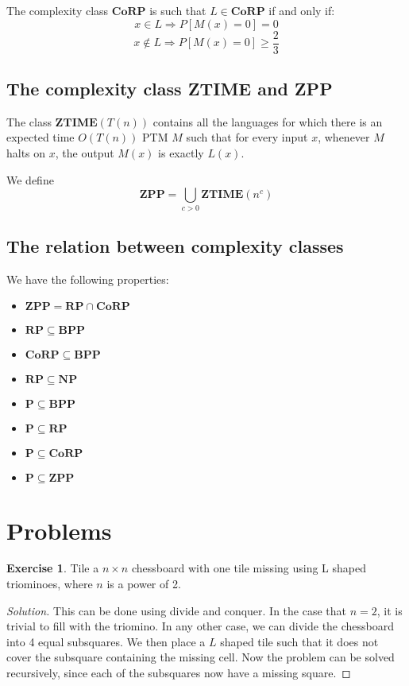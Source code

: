 \documentclass[12pt,letterpaper]{article}
\theoremstyle{definition}
\newtheorem*{exercise}{Exercise}
\newenvironment{solution}
  {\renewcommand\qedsymbol{$\blacksquare$}\begin{proof}[Solution]}
  {\end{proof}}
\begin{document}
The complexity class $\mathbf{CoRP}$ is such that $L \in \mathbf{CoRP}$ if and only if:
\[x \in L \Rightarrow P[M(x) = 0] = 0\]
\[x \notin L \Rightarrow P[M(x) = 0] \geq \frac{2}{3}\]

\subsection{The complexity class ZTIME and ZPP}

The class $\mathbf{ZTIME}(T(n))$ contains all the languages for which there is an expected time $O(T(n))$ PTM $M$ such that for every input $x$, whenever $M$ halts on $x$, the output $M(x)$ is exactly $L(x)$.

We define 
\[\mathbf{ZPP} = \bigcup_{c > 0} \mathbf{ZTIME}(n^c)\]

\subsection{The relation between complexity classes}

We have the following properties:

\begin{itemize}
  \item $\mathbf{ZPP} = \mathbf{RP} \cap \mathbf{CoRP}$
  \item $\mathbf{RP} \subseteq \mathbf{BPP}$
  \item $\mathbf{CoRP} \subseteq \mathbf{BPP}$
  \item $\mathbf{RP} \subseteq \mathbf{NP}$
  \item $\mathbf{P} \subseteq \mathbf{BPP}$
  \item $\mathbf{P} \subseteq \mathbf{RP}$
  \item $\mathbf{P} \subseteq \mathbf{CoRP}$
  \item $\mathbf{P} \subseteq \mathbf{ZPP}$
\end{itemize}

\section{Problems}

\begin{exercise}
  Tile a $n \times n$ chessboard with one tile missing using L shaped triominoes, where $n$ is a power of 2.
\end{exercise}
\begin{solution}
  This can be done using divide and conquer. In the case that $n = 2$, it is trivial to fill with the triomino.
  In any other case, we can divide the chessboard into 4 equal subsquares. We then place a $L$ shaped tile such that it does not cover the subsquare containing the missing cell. Now the problem can be solved recursively, since each of the subsquares now have a missing square.
\end{solution}
\end{document}
